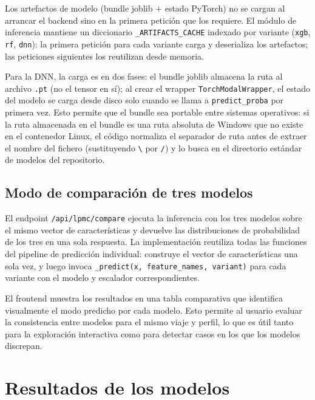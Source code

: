 Los artefactos de modelo (bundle joblib + estado PyTorch) no se cargan al arrancar el backend sino en la primera petición que los requiere. El módulo de inferencia mantiene un diccionario \texttt{\_ARTIFACTS\_CACHE} indexado por variante (\texttt{xgb}, \texttt{rf}, \texttt{dnn}): la primera petición para cada variante carga y deserializa los artefactos; las peticiones siguientes los reutilizan desde memoria.

Para la DNN, la carga es en dos fases: el bundle joblib almacena la ruta al archivo \texttt{.pt} (no el tensor en sí); al crear el wrapper \texttt{TorchModalWrapper}, el estado del modelo se carga desde disco solo cuando se llama a \texttt{predict\_proba} por primera vez. Esto permite que el bundle sea portable entre sistemas operativos: si la ruta almacenada en el bundle es una ruta absoluta de Windows que no existe en el contenedor Linux, el código normaliza el separador de ruta antes de extraer el nombre del fichero (sustituyendo \texttt{\textbackslash{}} por \texttt{/}) y lo busca en el directorio estándar de modelos del repositorio.

\subsection{Modo de comparación de tres modelos}

El endpoint \texttt{/api/lpmc/compare} ejecuta la inferencia con los tres modelos sobre el mismo vector de características y devuelve las distribuciones de probabilidad de los tres en una sola respuesta. La implementación reutiliza todas las funciones del pipeline de predicción individual: construye el vector de características una sola vez, y luego invoca \texttt{\_predict(x, feature\_names, variant)} para cada variante con el modelo y escalador correspondientes.

El frontend muestra los resultados en una tabla comparativa que identifica visualmente el modo predicho por cada modelo. Esto permite al usuario evaluar la consistencia entre modelos para el mismo viaje y perfil, lo que es útil tanto para la exploración interactiva como para detectar casos en los que los modelos discrepan.

\section{Resultados de los modelos}
\label{sec:impl_resultados}

